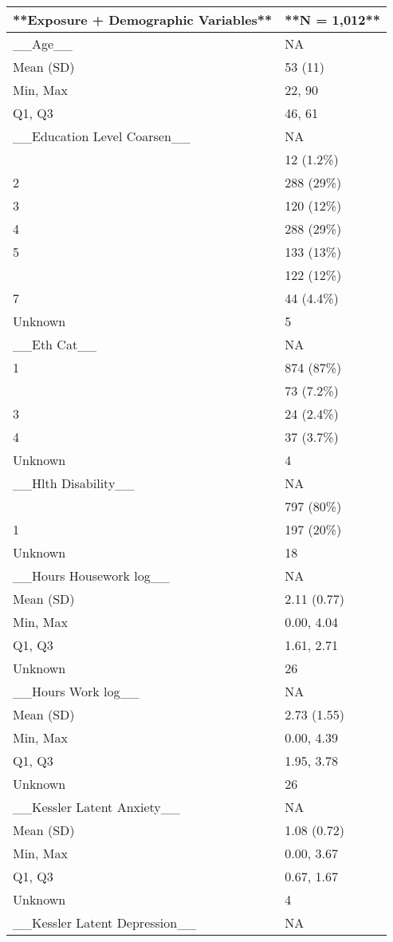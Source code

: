 \documentclass[
  singlecolumn]{article}
\begin{document}
\begin{tabular}[t]{ll}
\toprule
**Exposure + Demographic Variables** & **N = 1,012**\\
\midrule
\_\_Age\_\_ & NA\\
Mean (SD) & 53 (11)\\
Min, Max & 22, 90\\
Q1, Q3 & 46, 61\\
\_\_Education Level Coarsen\_\_ & NA\\
\addlinespace
1 & 12 (1.2\%)\\
2 & 288 (29\%)\\
3 & 120 (12\%)\\
4 & 288 (29\%)\\
5 & 133 (13\%)\\
\addlinespace
6 & 122 (12\%)\\
7 & 44 (4.4\%)\\
Unknown & 5\\
\_\_Eth Cat\_\_ & NA\\
1 & 874 (87\%)\\
\addlinespace
2 & 73 (7.2\%)\\
3 & 24 (2.4\%)\\
4 & 37 (3.7\%)\\
Unknown & 4\\
\_\_Hlth Disability\_\_ & NA\\
\addlinespace
0 & 797 (80\%)\\
1 & 197 (20\%)\\
Unknown & 18\\
\_\_Hours Housework log\_\_ & NA\\
Mean (SD) & 2.11 (0.77)\\
\addlinespace
Min, Max & 0.00, 4.04\\
Q1, Q3 & 1.61, 2.71\\
Unknown & 26\\
\_\_Hours Work log\_\_ & NA\\
Mean (SD) & 2.73 (1.55)\\
\addlinespace
Min, Max & 0.00, 4.39\\
Q1, Q3 & 1.95, 3.78\\
Unknown & 26\\
\_\_Kessler Latent Anxiety\_\_ & NA\\
Mean (SD) & 1.08 (0.72)\\
\addlinespace
Min, Max & 0.00, 3.67\\
Q1, Q3 & 0.67, 1.67\\
Unknown & 4\\
\_\_Kessler Latent Depression\_\_ & NA\\

\end{tabular}
\end{document}
